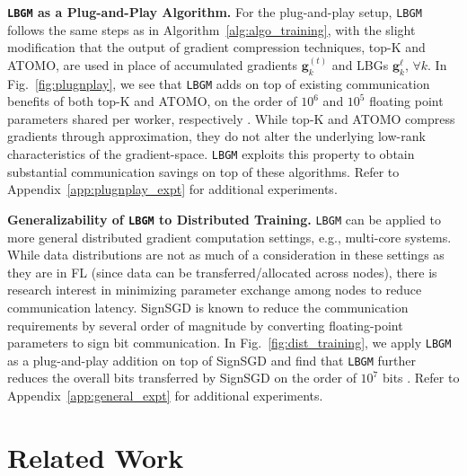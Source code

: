 \documentclass{article}
\newcommand{\shams}[1]{{\color{red}{#1}}}
\renewcommand{\shams}[1]{{\color{black}{#1}}}
\renewcommand{\vec}[3]{\boldsymbol{#1}_{#2}^{#3}}
\newcommand{\algName}{{\tt LBGM}}
\begin{document}
\vspace{-1mm}
\textbf{{\tt \algName} as a Plug-and-Play Algorithm.} For the plug-and-play setup, {\algName} follows the same steps as in Algorithm~\ref{alg:algo_training}, with the slight modification that the output of gradient compression techniques, top-K and ATOMO, are used in place of accumulated gradients $\vec{g}{k}{(t)}$ and LBGs $\vec{g}{k}{\ell}$, $\forall k$. In Fig.~\ref{fig:plugnplay}, we see that {\algName} adds on top of existing communication benefits of both top-K and ATOMO, on the order of $10^6$ and $10^5$ floating point parameters shared per worker, respectively \shams{($30-70\%$ savings across the datasets)}. \shams{The bottom row shows the accuracy/loss improvements that can be obtained for the same number of parameters transferred.} While top-K and ATOMO compress gradients through approximation, they do not alter the underlying low-rank characteristics of the gradient-space. {\algName} exploits this property to obtain substantial communication savings on top of these algorithms. Refer to Appendix~\ref{app:plugnplay_expt} for additional experiments.


\vspace{-1mm}
\textbf{Generalizability of {\algName} to Distributed Training.} {\algName} can be applied to more general distributed gradient computation settings, e.g., multi-core systems.
While \shams{heterogeneous (non-iid)} data distributions are not as much of a consideration in these settings as they are in FL (since data can be transferred/allocated across nodes), there is research interest in minimizing parameter exchange among nodes to reduce communication latency.
SignSGD \citep{bernstein2018signsgd} is known to reduce the communication requirements by several order of magnitude by converting floating-point parameters to sign bit communication. In Fig.~\ref{fig:dist_training}, we apply {\algName} as a plug-and-play addition on top of SignSGD and find that {\algName} further reduces the overall bits transferred by SignSGD on the order of $10^7$ bits \shams{($\smash{60-80\%}$ savings across the datasets)}. Refer to Appendix~\ref{app:general_expt} for additional experiments.



\vspace{-4mm}
\section{Related Work}
\vspace{-2mm}
\end{document}
